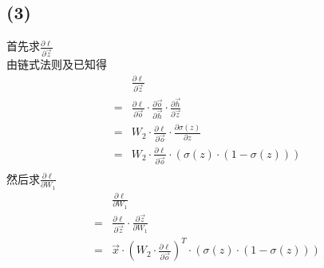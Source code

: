 \documentclass[12pt,a4paper]{article}
\begin{document}
\subsection*{(3)}
首先求$\frac{\partial \ell}{\partial \vec{z}}$\\
由链式法则及已知得
\begin{align*}
      & \frac{\partial \ell}{\partial \vec{z}}                                                                                                 \\
    = & \frac{\partial \ell}{\partial \vec{o}} \cdot \frac{\partial \vec{o}}{\partial \vec{h}} \cdot \frac{\partial \vec{h}}{\partial \vec{z}} \\
    = & W_2\cdot\frac{\partial \ell}{\partial \vec{o}}\cdot \frac{\partial \sigma(z) }{\partial z}                                             \\
    = & W_2\cdot\frac{\partial \ell}{\partial \vec{o}}\cdot (\sigma(z)\cdot(1-\sigma(z)))                                                      \\
\end{align*}
然后求$\frac{\partial \ell}{\partial W_1}$\\
\begin{align*}
      & \frac{\partial \ell}{\partial W_1}                                                                 \\
    = & \frac{\partial \ell}{\partial \vec{z}} \cdot \frac{\partial \vec{z}}{\partial W_1}                 \\
    = & \vec{x}\cdot (W_2\cdot\frac{\partial \ell}{\partial \vec{o}})^T\cdot (\sigma(z)\cdot(1-\sigma(z)))
\end{align*}
\end{document}
